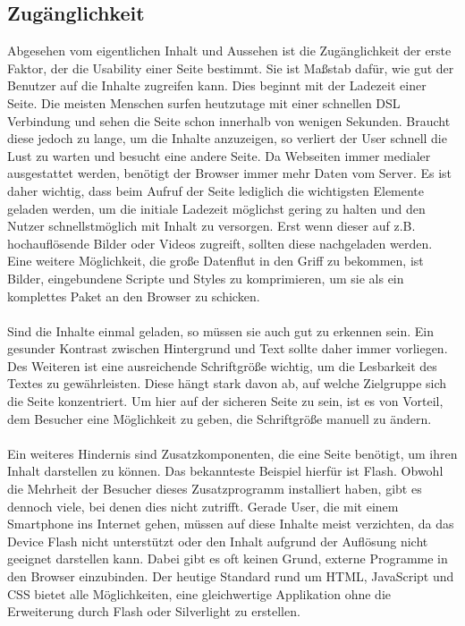 \subsection{Zugänglichkeit}


Abgesehen vom eigentlichen Inhalt und Aussehen ist die Zugänglichkeit der erste Faktor, der die Usability einer Seite bestimmt. Sie ist Maßstab dafür, wie gut der Benutzer auf die Inhalte zugreifen kann. Dies beginnt mit der Ladezeit einer Seite. Die meisten Menschen surfen heutzutage mit einer schnellen DSL Verbindung und sehen die Seite schon innerhalb von wenigen Sekunden. Braucht diese jedoch zu lange, um die Inhalte anzuzeigen, so verliert der User schnell die Lust zu warten und besucht eine andere Seite. Da Webseiten immer medialer ausgestattet werden, benötigt der Browser immer mehr Daten vom Server. Es ist daher wichtig, dass beim Aufruf der Seite lediglich die wichtigsten Elemente geladen werden, um die initiale Ladezeit möglichst gering zu halten und den Nutzer schnellstmöglich mit Inhalt zu versorgen. Erst wenn dieser auf z.B. hochauflösende Bilder oder Videos zugreift, sollten diese nachgeladen werden. Eine weitere Möglichkeit, die große Datenflut in den Griff zu bekommen, ist Bilder, eingebundene Scripte und Styles zu komprimieren, um sie als ein komplettes Paket an den Browser zu schicken.\\
\\
Sind die Inhalte einmal geladen, so müssen sie auch gut zu erkennen sein. Ein gesunder Kontrast zwischen Hintergrund und Text sollte daher immer vorliegen. Des Weiteren ist eine ausreichende Schriftgröße wichtig, um die Lesbarkeit des Textes zu gewährleisten. Diese hängt stark davon ab, auf welche Zielgruppe sich die Seite konzentriert. Um hier auf der sicheren Seite zu sein, ist es von Vorteil, dem Besucher eine Möglichkeit zu geben, die Schriftgröße manuell zu ändern.\\
\\
Ein weiteres Hindernis sind Zusatzkomponenten, die eine Seite benötigt, um ihren Inhalt darstellen zu können. Das bekannteste Beispiel hierfür ist Flash. Obwohl die Mehrheit der Besucher dieses Zusatzprogramm installiert haben, gibt es dennoch viele, bei denen dies nicht zutrifft. Gerade User, die mit einem Smartphone ins Internet gehen, müssen auf diese Inhalte meist verzichten, da das Device Flash nicht unterstützt oder den Inhalt aufgrund der Auflösung nicht geeignet darstellen kann. Dabei gibt es oft keinen Grund, externe Programme in den Browser einzubinden. Der heutige Standard rund um HTML, JavaScript und CSS bietet alle Möglichkeiten, eine gleichwertige Applikation ohne die Erweiterung durch Flash oder Silverlight zu erstellen.\\

